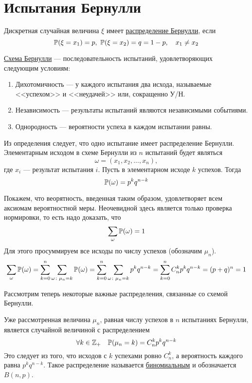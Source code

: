 \documentclass[../TV&MS.tex]{subfiles}
\begin{document}
    
\section{Испытания Бернулли}

\begin{Def}
Дискретная случайная величина $\xi$ имеет \underline{распределение Бернулли}, если
$$ \mathbb{P}(\xi = x_1) = p,\ \mathbb{P}(\xi = x_2) = q = 1 - p, \quad x_1 \not= x_2$$
\end{Def}

\begin{Def}
\underline{Схема Бернулли} --- последовательность испытаний, удовлетворяющих следующим условиям:
\begin{enumerate}
	\item Дихотомичность --- у каждого испытания два исхода, называемые <<успехом>> и <<неудачей>> или, сокращенно У/Н.
	\item Независимость --- результаты испытаний являются независимыми событиями.
	\item Однородность --- вероятности успеха в каждом испытании равны.
\end{enumerate}
\end{Def}

Из определения следует, что одно испытание имеет распределение Бернулли. Элементарным исходом в схеме Бернулли из $n$ испытаний будет являться
$$\omega = (x_1, x_2, \ldots, x_n),$$
где $x_i$ --- результат испытания $i$. Пусть в элементарном исходе $k$ успехов. Тогда
$$\mathbb{P}(\omega) = p^kq^{n-k}$$

Покажем, что веорятность, введенная таким образом, удовлетворяет всем аксиомам вероятностной меры. Неочевидной здесь является только проверка нормировки, то есть надо доказать, что
$$ \sum\limits_{\omega}\mathbb{P}(\omega) = 1$$
Для этого просуммируем все исходы по числу успехов (обозначим $\mu_n$).
$$ \sum\limits_{\omega}\mathbb{P}(\omega) = \sum\limits_{k = 0}^n\sum\limits_{\omega\colon\mu_n=k}\mathbb{P}(\omega) = \sum\limits_{k = 0}^n\sum\limits_{\omega\colon\mu_n=k}p^kq^{n-k} = 
\sum\limits_{k = 0}^nC_n^kp^kq^{n-k} = (p+q)^n = 1$$

Рассмотрим теперь некоторые важные распределения, связанные со схемой Бернулли.

Уже рассмотренная величина $\mu_n$, равная числу успехов в $n$ испытаниях Бернулли, является случайной величиной с распределением
$$\forall k \in \mathbb{Z}_+ \quad \mathbb{P}(\mu_n=k) = C_n^kp^kq^{n-k}$$
Это следует из того, что исходов с $k$ успехами ровно $C_n^k$, а вероятность каждого равна $p^kq^{n-k}$.
Такое распределение называется \underline{биномиальным} и обозначается $B(n,p)$.
\end{document}
